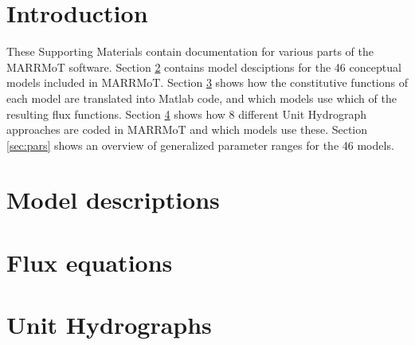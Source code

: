 \documentclass{article}
\begin{document}
%
%
%
%
%
\tableofcontents
\listoftables

\pagestyle{fancy}
\newpage
\section{Introduction}  %
These Supporting Materials contain documentation for various parts of the MARRMoT software. Section \ref{sec:mod_desc} contains model desciptions for the 46 conceptual models included in MARRMoT. Section \ref{sec:flux} shows how the constitutive functions of each model are translated into Matlab code, and which models use which of the resulting flux functions. Section \ref{sec:uhs} shows how 8 different Unit Hydrograph approaches are coded in MARRMoT and which models use these. Section \ref{sec:pars} shows an overview of generalized parameter ranges for the 46 models.

\newpage
\section{Model descriptions} 	\label{sec:mod_desc}


\newpage
\section{Flux equations} 		\label{sec:flux}


\newpage
\section{Unit Hydrographs} 		\label{sec:uhs}

\end{document}
